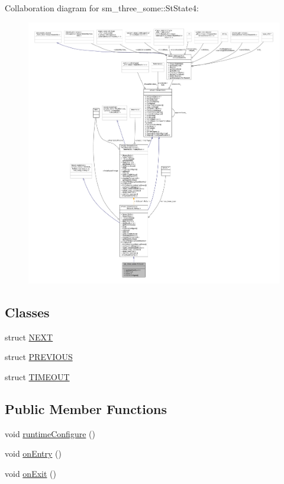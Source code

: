 Collaboration diagram for sm\+\_\+three\+\_\+some\+:\+:St\+State4\+:
\nopagebreak
\begin{figure}[H]
\begin{center}
\leavevmode
\includegraphics[width=350pt]{structsm__three__some_1_1StState4__coll__graph}
\end{center}
\end{figure}
\subsection*{Classes}
\begin{DoxyCompactItemize}
\item 
struct \hyperlink{structsm__three__some_1_1StState4_1_1NEXT}{N\+E\+XT}
\item 
struct \hyperlink{structsm__three__some_1_1StState4_1_1PREVIOUS}{P\+R\+E\+V\+I\+O\+US}
\item 
struct \hyperlink{structsm__three__some_1_1StState4_1_1TIMEOUT}{T\+I\+M\+E\+O\+UT}
\end{DoxyCompactItemize}
\subsection*{Public Member Functions}
\begin{DoxyCompactItemize}
\item 
void \hyperlink{structsm__three__some_1_1StState4_a44ef81afd6a1ad3144fbc39c44954439}{runtime\+Configure} ()
\item 
void \hyperlink{structsm__three__some_1_1StState4_a2140ab3ca693422132501cab77efca63}{on\+Entry} ()
\item 
void \hyperlink{structsm__three__some_1_1StState4_a3479e642b294941bb91c09d211df84e7}{on\+Exit} ()
\end{DoxyCompactItemize}
